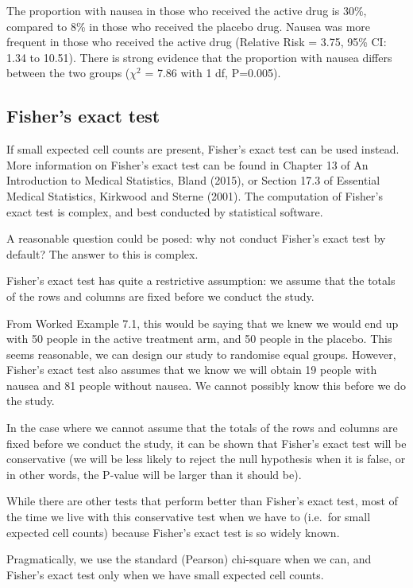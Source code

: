 \documentclass[
  a4paper,
]{memoir}
\begin{document}
The proportion with nausea in those who received the active drug is
30\%, compared to 8\% in those who received the placebo drug. Nausea was
more frequent in those who received the active drug (Relative Risk =
3.75, 95\% CI: 1.34 to 10.51). There is strong evidence that the
proportion with nausea differs between the two groups (\(\chi ^2\) =
7.86 with 1 df, P=0.005).

\subsection{Fisher's exact test}\label{fishers-exact-test}

If small expected cell counts are present, Fisher's exact test can be
used instead. More information on Fisher's exact test can be found in
Chapter 13 of An Introduction to Medical Statistics, Bland (2015), or
Section 17.3 of Essential Medical Statistics, Kirkwood and Sterne
(2001). The computation of Fisher's exact test is complex, and best
conducted by statistical software.

A reasonable question could be posed: why not conduct Fisher's exact
test by default? The answer to this is complex.

Fisher's exact test has quite a restrictive assumption: we assume that
the totals of the rows and columns are fixed before we conduct the
study.

From Worked Example 7.1, this would be saying that we knew we would end
up with 50 people in the active treatment arm, and 50 people in the
placebo. This seems reasonable, we can design our study to randomise
equal groups. However, Fisher's exact test also assumes that we know we
will obtain 19 people with nausea and 81 people without nausea. We
cannot possibly know this before we do the study.

In the case where we cannot assume that the totals of the rows and
columns are fixed before we conduct the study, it can be shown that
Fisher's exact test will be conservative (we will be less likely to
reject the null hypothesis when it is false, or in other words, the
P-value will be larger than it should be).

While there are other tests that perform better than Fisher's exact
test, most of the time we live with this conservative test when we have
to (i.e.~for small expected cell counts) because Fisher's exact test is
so widely known.

Pragmatically, we use the standard (Pearson) chi-square when we can, and
Fisher's exact test only when we have small expected cell counts.
\end{document}
